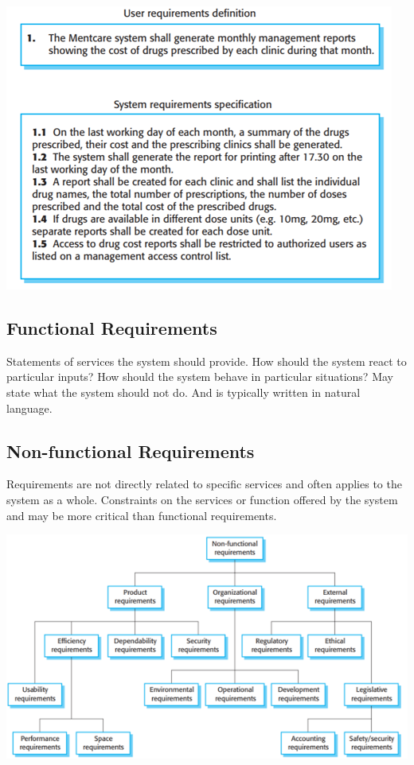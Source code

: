 \documentclass{article}
\begin{document}
    \begin{center}
        \includegraphics[scale=0.7]{types_of_requirements.png}
    \end{center}

    \subsection*{Functional Requirements}

    Statements of services the system should provide.
    How should the system react to particular inputs?
    How should the system behave in particular situations?
    May state what the system should not do.
    And is typically written in natural language.

    \subsection*{Non-functional Requirements}

    Requirements are not directly related to specific services and often applies to the 
    system as a whole. Constraints on the services or function offered by the system and 
    may be more critical than functional requirements.

    \begin{center}
        \includegraphics[scale=0.7]{non-functional_requirements.png}
    \end{center}
\end{document}
